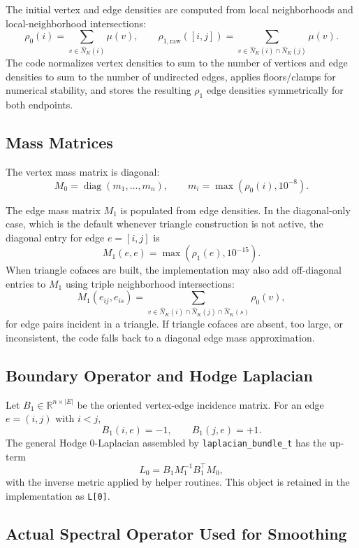 \documentclass[11pt]{article}
\newcommand{\code}[1]{\texttt{#1}}
\newcommand{\diag}{\operatorname{diag}}
\begin{document}
The initial vertex and edge densities are computed from local neighborhoods
and local-neighborhood intersections:
\[
  \rho_0(i)
    =
    \sum_{v\in \widehat N_K(i)} \mu(v),
  \qquad
  \rho_{1,\mathrm{raw}}([i,j])
    =
    \sum_{v\in \widehat N_K(i)\cap \widehat N_K(j)} \mu(v).
\]
The code normalizes vertex densities to sum to the number of vertices and edge
densities to sum to the number of undirected edges, applies floors/clamps for
numerical stability, and stores the resulting \(\rho_1\) edge densities
symmetrically for both endpoints.

\subsection{Mass Matrices}

The vertex mass matrix is diagonal:
\[
  M_0 = \diag(m_1,\ldots,m_n),
  \qquad
  m_i = \max(\rho_0(i),10^{-8}).
\]

The edge mass matrix \(M_1\) is populated from edge densities. In the
diagonal-only case, which is the default whenever triangle construction is not
active, the diagonal entry for edge \(e=[i,j]\) is
\[
  M_1(e,e) = \max(\rho_1(e),10^{-15}).
\]
When triangle cofaces are built, the implementation may also add off-diagonal
entries to \(M_1\) using triple neighborhood intersections:
\[
  M_1(e_{ij},e_{is})
    =
    \sum_{v\in
      \widehat N_K(i)\cap \widehat N_K(j)\cap \widehat N_K(s)}
      \rho_0(v),
\]
for edge pairs incident in a triangle. If triangle cofaces are absent, too
large, or inconsistent, the code falls back to a diagonal edge mass
approximation.

\subsection{Boundary Operator and Hodge Laplacian}

Let \(B_1\in\mathbb{R}^{n\times |E|}\) be the oriented vertex-edge incidence
matrix. For an edge \(e=(i,j)\) with \(i<j\),
\[
  B_1(i,e)=-1,\qquad B_1(j,e)=+1.
\]
The general Hodge 0-Laplacian assembled by \code{laplacian\_bundle\_t} has the
up-term
\[
  L_0 = B_1 M_1^{-1} B_1^\top M_0,
\]
with the inverse metric applied by helper routines. This object is retained in
the implementation as \code{L[0]}.

\subsection{Actual Spectral Operator Used for Smoothing}
\end{document}
